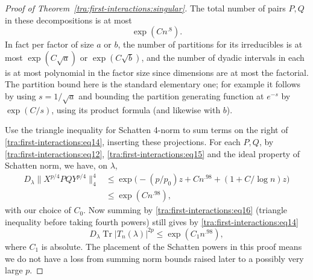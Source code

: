 \begin{proof}[Proof of Theorem~\ref{tra:first-interactions:singular}]
\label{tra:first-interactions:band-count-and-intermediate-trace}
The total number of pairs \(P,Q\) in these decompositions is at most
\begin{equation}
                                      \exp(C n^{.8}).\label{tra:first-interactions:eq16}
\end{equation}
In fact per factor of size \(a\) or \(b\), the number of partitions for its irreducibles is at most \(\exp(C\sqrt a)\) or \(\exp(C\sqrt b)\), and the number of dyadic intervals in each is at most polynomial in the factor size since dimensions are at most the factorial. The partition bound here is the standard elementary one; for example it follows by using \(s=1/\sqrt a\) and bounding the partition generating function at \(e^{-s}\) by \(\exp(C/s)\), using its product formula (and likewise with \(b\)).

Use the triangle inequality for Schatten 4-norm to sum terms on the right of \eqref{tra:first-interactions:eq14}, inserting these projections. For each \(P,Q\), by \eqref{tra:first-interactions:eq12}, \eqref{tra:first-interactions:eq15} and the ideal property of Schatten norm, we have, on \(\lambda\),
\[
 \begin{aligned}
 D_\lambda \| X^{p/4} P Q Y^{p/4} \|_4^4
   &\le \exp\big(- (p/p_0)z + C n^{.98}+(1+C/\log n)z\big)\\
   &\le \exp(C n^{.98}),
 \end{aligned}
\]
with our choice of \(C_0\). Now summing by \eqref{tra:first-interactions:eq16} (triangle inequality before taking fourth powers) still gives by \eqref{tra:first-interactions:eq14}
\begin{equation}
                         D_\lambda \operatorname{Tr}|T_n(\lambda)|^{2p}
                                  \le \exp(C_1 n^{.98}),\label{tra:first-interactions:eq17}
\end{equation}
where \(C_1\) is absolute. The placement of the Schatten powers in this proof means we do not have a loss from summing norm bounds raised later to a possibly very large \(p\).


\end{proof}
